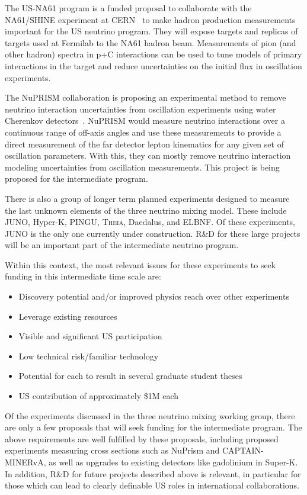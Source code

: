 The US-NA61 program is a funded proposal to collaborate with the
NA61/SHINE experiment at CERN~\cite{Gazdzicki:2014bxa} to make hadron
production measurements important for the US neutrino program.  They
will expose targets and replicas of targets used at Fermilab to the
NA61 hadron beam.  Measurements of pion (and other hadron) spectra in
p+C interactions can be used to tune models of primary interactions in
the target and reduce uncertainties on the initial flux in oscillation
experiments.

The NuPRISM collaboration is proposing an experimental method to
remove neutrino interaction uncertainties from oscillation
experiments using water Cherenkov detectors~\cite{Bhadra:2014oma}.  NuPRISM would measure neutrino
interactions over a continuous range of off-axis angles and use these
measurements to provide a direct measurement of the far detector
lepton kinematics for any given set of oscillation parameters.  With
this, they can mostly remove neutrino interaction modeling
uncertainties from oscillation measurements.  This project is being
proposed for the intermediate program.

There is also a group of longer term planned experiments designed to
measure the last unknown elements of the three neutrino mixing model.
These include JUNO, Hyper-K, PINGU, \textsc{Theia}, Daedalus, and ELBNF. Of these experiments, JUNO is the only one currently under construction.  
R\&D for these large projects will be an important part of the intermediate
neutrino program.

Within this context, the most relevant issues for these experiments
to seek funding in this intermediate time scale are:
\vspace*{-0.4cm}
\begin{itemize}
\item Discovery potential and/or improved physics reach over other experiments
\vspace*{-0.4cm}
\item Leverage existing resources \vspace*{-0.4cm}
\item Visible and significant US participation \vspace*{-0.4cm}
\item Low technical risk/familiar technology \vspace*{-0.4cm}
\item Potential for each to result in several graduate student theses \vspace*{-0.4cm}
\item US contribution of approximately \$1M each \vspace*{-0.4cm}
\end{itemize}

Of the experiments discussed in the three neutrino mixing working group, there are only a few proposals that will seek funding for the intermediate program.  The above requirements are well fulfilled by these proposals, including proposed experiments
measuring cross sections such as NuPrism and CAPTAIN-MINERvA, as well
as upgrades to existing detectors like gadolinium in Super-K.  In
addition, R\&D for future projects described above is
relevant, in particular for those which can lead to clearly definable US
roles in international collaborations.
